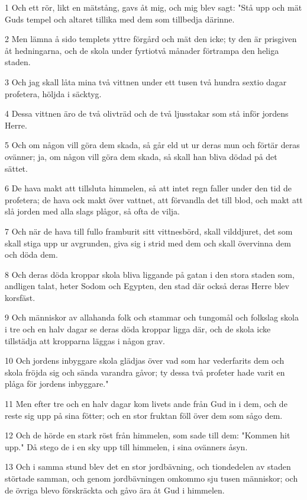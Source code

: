 \par 1 Och ett rör, likt en mätstång, gavs åt mig, och mig blev sagt: "Stå upp och mät Guds tempel och altaret tillika med dem som tillbedja därinne.
\par 2 Men lämna å sido templets yttre förgård och mät den icke; ty den är prisgiven åt hedningarna, och de skola under fyrtiotvå månader förtrampa den heliga staden.
\par 3 Och jag skall låta mina två vittnen under ett tusen två hundra sextio dagar profetera, höljda i säcktyg.
\par 4 Dessa vittnen äro de två olivträd och de två ljusstakar som stå inför jordens Herre.
\par 5 Och om någon vill göra dem skada, så går eld ut ur deras mun och förtär deras ovänner; ja, om någon vill göra dem skada, så skall han bliva dödad på det sättet.
\par 6 De hava makt att tillsluta himmelen, så att intet regn faller under den tid de profetera; de hava ock makt över vattnet, att förvandla det till blod, och makt att slå jorden med alla slags plågor, så ofta de vilja.
\par 7 Och när de hava till fullo framburit sitt vittnesbörd, skall vilddjuret, det som skall stiga upp ur avgrunden, giva sig i strid med dem och skall övervinna dem och döda dem.
\par 8 Och deras döda kroppar skola bliva liggande på gatan i den stora staden som, andligen talat, heter Sodom och Egypten, den stad där också deras Herre blev korsfäst.
\par 9 Och människor av allahanda folk och stammar och tungomål och folkslag skola i tre och en halv dagar se deras döda kroppar ligga där, och de skola icke tillstädja att kropparna läggas i någon grav.
\par 10 Och jordens inbyggare skola glädjas över vad som har vederfarits dem och skola fröjda sig och sända varandra gåvor; ty dessa två profeter hade varit en plåga för jordens inbyggare."
\par 11 Men efter tre och en halv dagar kom livets ande från Gud in i dem, och de reste sig upp på sina fötter; och en stor fruktan föll över dem som sågo dem.
\par 12 Och de hörde en stark röst från himmelen, som sade till dem: "Kommen hit upp." Då stego de i en sky upp till himmelen, i sina ovänners åsyn.
\par 13 Och i samma stund blev det en stor jordbävning, och tiondedelen av staden störtade samman, och genom jordbävningen omkommo sju tusen människor; och de övriga blevo förskräckta och gåvo ära åt Gud i himmelen.
